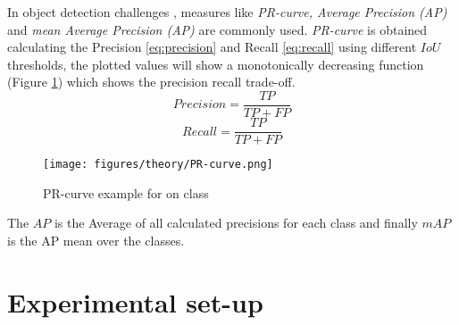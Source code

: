 \documentclass{IEEEtran}
\begin{document}
In object detection challenges \cite{datasets:coco, datasets:pascal}, measures
like \emph{PR-curve, Average Precision (AP)} and \emph{mean Average Precision
(AP)} are commonly used. \emph{PR-curve} is obtained calculating the Precision
\eqref{eq:precision} and Recall \eqref{eq:recall} using different $IoU$
thresholds, the plotted values will show a monotonically decreasing function
(Figure \ref{fig:PR-curve}) which shows the precision recall trade-off.
\begin{equation}
    Precision = \frac{TP}{TP + FP}
    \label{eq:precision}
\end{equation}
\begin{equation}
    Recall = \frac{TP}{TP + FP}
    \label{eq:recall}
\end{equation}
\begin{figure}[ht]
    \centering
    \texttt{[image: figures/theory/PR-curve.png]}
    \caption{PR-curve example for on class}
    \label{fig:PR-curve}
\end{figure}
The $AP$ is the Average of all calculated precisions for each class and finally
$mAP$ is the AP mean over the classes.

\section{Experimental set-up}
\printbibliography
\end{document}
